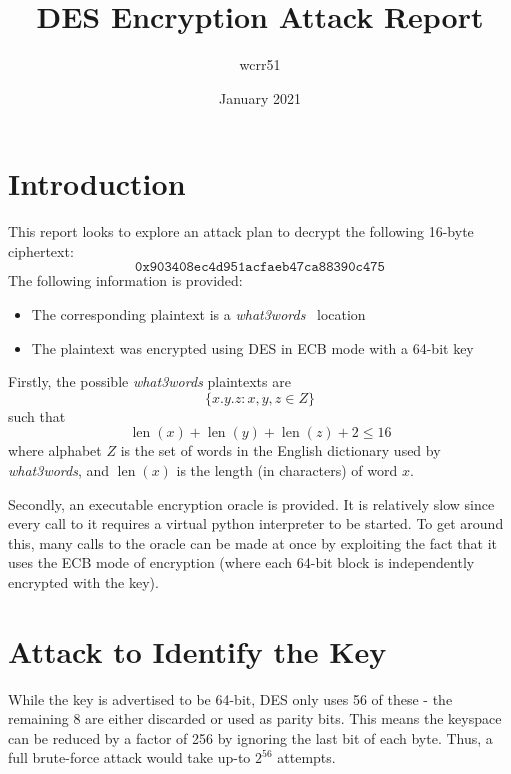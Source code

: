 \documentclass[11pt]{article}
\title{DES Encryption Attack Report}
\author{wcrr51}
\date{January 2021}
\DeclareMathOperator{\len}{len}
\begin{document}
    \maketitle

    \begin{multicols*}{2}
        \section{Introduction}\label{sec:introduction}
        This report looks to explore an attack plan to decrypt the following 16-byte ciphertext:
        \[\texttt{0x903408ec4d951acfaeb47ca88390c475} \tag{1}\label{eq:ciphertext}\]
        The following information is provided:
        \begin{itemize}
            \item The corresponding plaintext is a \textit{what3words}~\cite{what3words} location
            \item The plaintext was encrypted using DES in ECB mode with a 64-bit key
        \end{itemize}

        Firstly, the possible \textit{what3words} plaintexts are
        \[\{x.y.z : x, y, z \in Z\}\tag{2}\label{eq:plaintext_definition}\]
        such that
        \[\len(x) + \len(y) + \len(z) + 2 \leq 16 \tag{3}\label{eq:word_constraint}\]
        where alphabet $Z$ is the set of words in the English dictionary used by \textit{what3words}, and $\len(x)$ is the length (in characters) of word $x$.

        Secondly, an executable encryption oracle is provided.
        It is relatively slow since every call to it requires a virtual python interpreter to be started.
        To get around this, many calls to the oracle can be made at once by exploiting the fact that it uses the ECB mode of encryption (where each 64-bit block is independently encrypted with the key).


        \section{Attack to Identify the Key}\label{sec:key-identification-attack}
        While the key is advertised to be 64-bit, DES only uses 56 of these - the remaining 8 are either discarded or used as parity bits.
        This means the keyspace can be reduced by a factor of 256 by ignoring the last bit of each byte.
        Thus, a full brute-force attack would take up-to $2^{56}$ attempts.


\end{multicols*}
\end{document}
